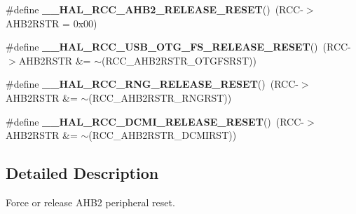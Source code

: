 \begin{DoxyCompactItemize}
\item 
\#define {\bfseries \+\_\+\+\_\+\+H\+A\+L\+\_\+\+R\+C\+C\+\_\+\+A\+H\+B2\+\_\+\+R\+E\+L\+E\+A\+S\+E\+\_\+\+R\+E\+S\+ET}()~(R\+CC-\/$>$A\+H\+B2\+R\+S\+TR = 0x00)\hypertarget{group___r_c_c_ex___a_h_b2___force___release___reset_gae5bd400860d81b996fafa310df1f2eec}{}\label{group___r_c_c_ex___a_h_b2___force___release___reset_gae5bd400860d81b996fafa310df1f2eec}

\item 
\#define {\bfseries \+\_\+\+\_\+\+H\+A\+L\+\_\+\+R\+C\+C\+\_\+\+U\+S\+B\+\_\+\+O\+T\+G\+\_\+\+F\+S\+\_\+\+R\+E\+L\+E\+A\+S\+E\+\_\+\+R\+E\+S\+ET}()~(R\+CC-\/$>$A\+H\+B2\+R\+S\+TR \&= $\sim$(R\+C\+C\+\_\+\+A\+H\+B2\+R\+S\+T\+R\+\_\+\+O\+T\+G\+F\+S\+R\+ST))\hypertarget{group___r_c_c_ex___a_h_b2___force___release___reset_gaa6020376afc45814f682e039aa1248e7}{}\label{group___r_c_c_ex___a_h_b2___force___release___reset_gaa6020376afc45814f682e039aa1248e7}

\item 
\#define {\bfseries \+\_\+\+\_\+\+H\+A\+L\+\_\+\+R\+C\+C\+\_\+\+R\+N\+G\+\_\+\+R\+E\+L\+E\+A\+S\+E\+\_\+\+R\+E\+S\+ET}()~(R\+CC-\/$>$A\+H\+B2\+R\+S\+TR \&= $\sim$(R\+C\+C\+\_\+\+A\+H\+B2\+R\+S\+T\+R\+\_\+\+R\+N\+G\+R\+ST))\hypertarget{group___r_c_c_ex___a_h_b2___force___release___reset_gabdd1350e70f9c77e25ea67c9929003e8}{}\label{group___r_c_c_ex___a_h_b2___force___release___reset_gabdd1350e70f9c77e25ea67c9929003e8}

\item 
\#define {\bfseries \+\_\+\+\_\+\+H\+A\+L\+\_\+\+R\+C\+C\+\_\+\+D\+C\+M\+I\+\_\+\+R\+E\+L\+E\+A\+S\+E\+\_\+\+R\+E\+S\+ET}()~(R\+CC-\/$>$A\+H\+B2\+R\+S\+TR \&= $\sim$(R\+C\+C\+\_\+\+A\+H\+B2\+R\+S\+T\+R\+\_\+\+D\+C\+M\+I\+R\+ST))\hypertarget{group___r_c_c_ex___a_h_b2___force___release___reset_ga3aa819914ced10bc641eadb4bda93e90}{}\label{group___r_c_c_ex___a_h_b2___force___release___reset_ga3aa819914ced10bc641eadb4bda93e90}

\end{DoxyCompactItemize}


\subsection{Detailed Description}
Force or release A\+H\+B2 peripheral reset. 


